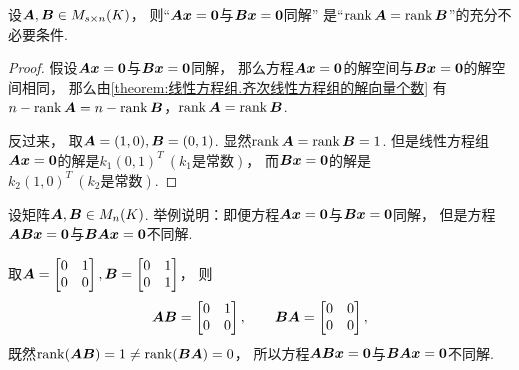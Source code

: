\begin{proposition}\label{theorem:线性方程组.同解方程组的系数矩阵的秩相同}
设\(\boldsymbol{A},\boldsymbol{B} \in M_{s \times n}(K)\)，
则“\(\boldsymbol{A}\boldsymbol{x}=\boldsymbol0\)与\(\boldsymbol{B}\boldsymbol{x}=\boldsymbol0\)同解”
是“\(\rank\boldsymbol{A}=\rank\boldsymbol{B}\)”的充分不必要条件.
\begin{proof}
假设\(\boldsymbol{A}\boldsymbol{x}=\boldsymbol0\)与\(\boldsymbol{B}\boldsymbol{x}=\boldsymbol0\)同解，
那么方程\(\boldsymbol{A}\boldsymbol{x}=\boldsymbol0\)的解空间与\(\boldsymbol{B}\boldsymbol{x}=\boldsymbol0\)的解空间相同，
那么由\cref{theorem:线性方程组.齐次线性方程组的解向量个数}
有\(n-\rank\boldsymbol{A}=n-\rank\boldsymbol{B}\)，\(\rank\boldsymbol{A}=\rank\boldsymbol{B}\).

反过来，
取\(\boldsymbol{A} = (1,0),
\boldsymbol{B} = (0,1)\).
显然\(\rank\boldsymbol{A} = \rank\boldsymbol{B} = 1\).
但是线性方程组\(\boldsymbol{A}\boldsymbol{x}=\boldsymbol0\)的解是\(k_1(0,1)^T\ (\text{$k_1$是常数})\)，
而\(\boldsymbol{B}\boldsymbol{x}=\boldsymbol0\)的解是\(k_2(1,0)^T\ (\text{$k_2$是常数})\).
\end{proof}
\end{proposition}

\begin{example}
设矩阵\(\boldsymbol{A},\boldsymbol{B} \in M_n(K)\).
举例说明：即便方程\(\boldsymbol{A} \boldsymbol{x} = \boldsymbol0\)与\(\boldsymbol{B} \boldsymbol{x} = \boldsymbol0\)同解，
但是方程\(\boldsymbol{A} \boldsymbol{B} \boldsymbol{x} = \boldsymbol0\)与\(\boldsymbol{B} \boldsymbol{A} \boldsymbol{x} = \boldsymbol0\)不同解.
\begin{solution}
取\(\boldsymbol{A} = \begin{bmatrix}
	0 & 1 \\
	0 & 0
\end{bmatrix},
\boldsymbol{B} = \begin{bmatrix}
	0 & 1 \\
	0 & 1
\end{bmatrix}\)，
则\begin{equation*}
	\boldsymbol{A} \boldsymbol{B} = \begin{bmatrix}
		0 & 1 \\
		0 & 0
	\end{bmatrix},
	\qquad
	\boldsymbol{B} \boldsymbol{A} = \begin{bmatrix}
		0 & 0 \\
		0 & 0
	\end{bmatrix},
\end{equation*}
既然\(\rank(\boldsymbol{A} \boldsymbol{B}) = 1 \neq \rank(\boldsymbol{B} \boldsymbol{A}) = 0\)，
所以方程\(\boldsymbol{A} \boldsymbol{B} \boldsymbol{x} = \boldsymbol0\)与\(\boldsymbol{B} \boldsymbol{A} \boldsymbol{x} = \boldsymbol0\)不同解.
\end{solution}
\end{example}

